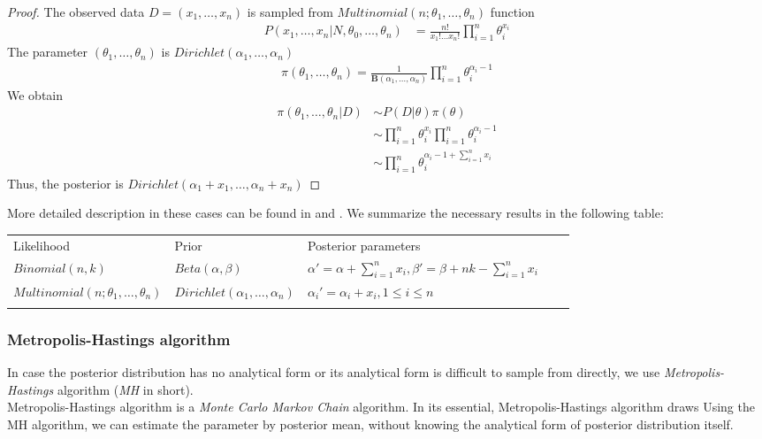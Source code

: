 \documentclass[12pt]{article}
\theoremstyle{definition}
\begin{document}
\begin{proof}
  The observed data $D=(x_1,\ldots,x_n)$ is sampled from $Multinomial(n; \theta_1,\ldots,\theta_n)$ function
  \begin{align*}
    P(x_1,\ldots,x_n | N, \theta_0,\ldots,\theta_n) &= \frac{n!}{x_1!\ldots x_n!} \prod_{i=1}^n\theta_i^{x_i}
  \end{align*}
  The parameter $(\theta_1,\ldots,\theta_n)$ is
  $Dirichlet(\alpha_1,\ldots,\alpha_n)$
  \begin{align*}
    \pi(\theta_1,\ldots,\theta_n) = \frac{1}{\mathbf{B}(\alpha_1,\ldots,\alpha_n)}\prod_{i=1}^n\theta_i^{\alpha_i - 1}
  \end{align*}
  We obtain
  \begin{align*}
    \pi(\theta_1,\ldots,\theta_n|D) &\sim P(D|\theta)\pi(\theta) \\
                                    &\sim \prod_{i=1}^n\theta_i^{x_i} \prod_{i=1}^n\theta_i^{\alpha_i - 1} \\
                                    &\sim \prod_{i=1}^n\theta_i^{\alpha_i - 1 + \sum_{i=1}^n x_i}
  \end{align*}
  Thus, the posterior is $Dirichlet(\alpha_1 +  x_1,\ldots,\alpha_n
  +  x_n)$
\end{proof}
More detailed description in these cases can be found in \cite{tu2014dirichlet}
and \cite{baron2019probability}. We summarize the necessary results in the following table:
\begin{table}[H]
\begin{tabular}{lllll}
\cline{1-3}
\multicolumn{1}{|l|}{Likelihood} & \multicolumn{1}{l|}{Prior} & \multicolumn{1}{l|}{Posterior parameters} &  &  \\ \cline{1-3}
  \multicolumn{1}{|l|}{$Binomial(n, k)$}  & \multicolumn{1}{l|}{$Beta(\alpha, \beta)$}  & \multicolumn{1}{l|}{$\alpha' = \alpha + \sum_{i=1}^n x_i, \beta' = \beta + nk -\sum_{i=1}^n x_i$}  &  &  \\ \cline{1-3}
  \multicolumn{1}{|l|}{$Multinomial(n; \theta_1,\ldots,\theta_n)$}  & \multicolumn{1}{l|}{$Dirichlet(\alpha_1,\ldots,\alpha_n)$}  & \multicolumn{1}{l|}{$\alpha_i' =\alpha_i + x_i, 1 \leq i \leq n$}  &  &  \\ \cline{1-3}
                        &                        &                        &  & 
\end{tabular}
\end{table}

\subsubsection{Metropolis-Hastings algorithm}
In case the posterior distribution has no analytical form or its analytical form
is difficult to sample from directly, we use \textit{Metropolis-Hastings}
algorithm (\textit{MH} in short).\\
Metropolis-Hastings algorithm is a \textit{Monte Carlo Markov Chain} algorithm.
In its essential, Metropolis-Hastings algorithm draws 
Using the MH algorithm, we can estimate the parameter by posterior mean, without
knowing the analytical form of posterior distribution itself.
\end{document}
